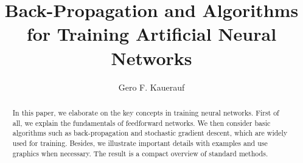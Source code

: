 \documentclass[runningheads]{llncs}
\numberwithin{equation}{subsection} %
\begin{document}
%
\title{Back-Propagation and Algorithms for Training Artificial Neural Networks}
%
%
\author{Gero F. Kauerauf}
%
%
%
\maketitle              %
%
\begin{abstract}
    In this paper, we elaborate on the key concepts in training neural networks.
    First of all, we explain the fundamentals of feedforward networks.
    We then consider basic algorithms such as back-propagation and stochastic gradient descent, which are widely used for training.
    Besides, we illustrate important details with examples and use graphics when necessary.
    The result is a compact overview of standard methods.
\end{abstract}
%
%
%















\end{document}
